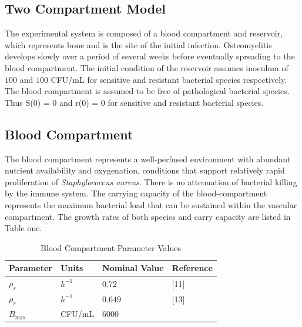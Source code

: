 \documentclass[12pt, draftcls, onecolumn]{IEEEtran}
\begin{document}
\subsection{Two Compartment Model}
The experimental system is composed of a blood compartment and reservoir, which represents bone and is the site of the initial infection. Osteomyelitis develops slowly over a period of several weeks before eventually spreading to the blood compartment. The initial condition of the reservoir assumes inoculum of $100$ and $100$ CFU/mL for sensitive and resistant bacterial species respectively.  The blood compartment is assumed to be free of pathological bacterial species.  Thus S(0) = 0 and r(0) = 0 for sensitive and resistant bacterial species.

\subsection{Blood Compartment}
The blood compartment represents a well-perfused environment with abundant nutrient availability and oxygenation, conditions that support relatively rapid proliferation of \textit{Staphylococcus aureus}. There is no attenuation of bacterial killing by the immune system. The carrying capacity of the blood-compartment represents the maximum bacterial load that can be sustained within the vascular compartment. The growth rates of both species and carry capacity are listed in Table one.


\begin{table}[H]
\centering
\large %
\renewcommand{\arraystretch}{1.35} %
\caption{Blood Compartment Parameter Values}
\vspace{0.5cm}
\begin{tabular}{l l l l}
\hline
\textbf{Parameter} & \textbf{Units} & \textbf{Nominal Value} & \textbf{Reference} \\
\hline
$\rho_s$ & $h^{-1}$ & 0.72 & [11] \\
$\rho_r$ & $h^{-1}$ & $0.649$ & [13]  \\
$B_{\max}$ & CFU/mL & $6000$ & \cite{nieman2022bacterial} \\
\hline
\end{tabular}
\end{table}
\end{document}
